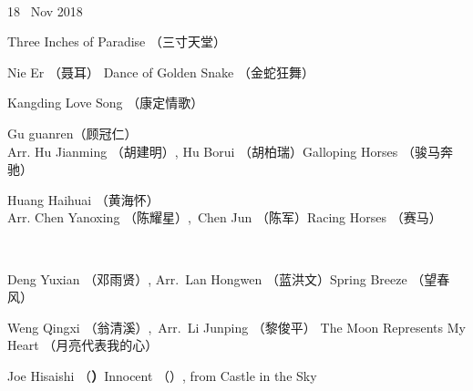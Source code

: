 \documentclass[letter,6pt,poets]{ConcProg}
\begin{document}
\begin{spacing}{1.0}
\begin{programme}{
\\  {\normalsize 18 ~Nov 2018}
}
\begin{part}[]
\begin{composition}{}{}{Three Inches of Paradise  （三寸天堂）}{}
    \end{composition}
    \begin{composition}{Nie Er （聂耳）} {}{Dance of Golden Snake  （金蛇狂舞）}{}
    \end{composition}
    \begin{composition}{}{}{Kangding Love Song  （康定情歌）}{}
    \end{composition}
    \begin{composition}{Gu guanren（顾冠仁）\\ Arr. Hu Jianming （胡建明）, Hu Borui （胡柏瑞）}{}{Galloping Horses  （骏马奔驰）}{}
    \end{composition}
    \begin{composition}{Huang Haihuai （黄海怀）\\ Arr. Chen Yanoxing （陈耀星）,\  Chen Jun （陈军）}{}{Racing Horses  （赛马）}{}
    \end{composition}\\
    \begin{composition}{Deng Yuxian （邓雨贤）, Arr.\ Lan Hongwen （蓝洪文）}{}{Spring Breeze  （望春风）}{}
    \end{composition}
    \begin{composition}{Weng Qingxi （翁清溪）,\ Arr.\ Li Junping （黎俊平） }{}{The Moon Represents My Heart  （月亮代表我的心）}{}
    \end{composition}
    \begin{composition}{Joe Hisaishi （\textbf{）}}{}{Innocent （）, from Castle in the Sky }{}
                   {}{}
    \end{composition}
    
    



\end{part}
\end{programme}
\end{spacing}
\end{document}
